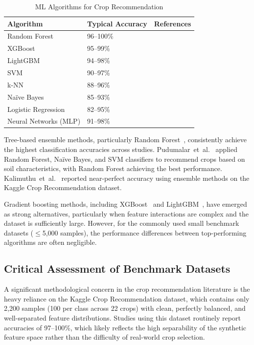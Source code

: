 \documentclass[journal]{IEEEtran}
\begin{document}
\begin{table}[htbp]
  \centering
  \caption{ML Algorithms for Crop Recommendation}
  \label{tab:crop_algorithms}
  \begin{tabular}{L{3.2cm} C{2.2cm} C{2cm}}
    \toprule
    \textbf{Algorithm} & \textbf{Typical Accuracy} & \textbf{References} \\
    \midrule
    Random Forest & 96--100\% & \cite{pudumalar2017crop,kalimuthu2020crop} \\
    XGBoost & 95--99\% & \cite{chen2016xgboost} \\
    LightGBM & 94--98\% & \cite{ke2017lightgbm} \\
    SVM & 90--97\% & \cite{pudumalar2017crop} \\
    k-NN & 88--96\% & \cite{rajak2017crop} \\
    Na{\"i}ve Bayes & 85--93\% & \cite{pudumalar2017crop} \\
    Logistic Regression & 82--95\% & \cite{bondre2019prediction} \\
    Neural Networks (MLP) & 91--98\% & \cite{bondre2019prediction} \\
    \bottomrule
  \end{tabular}
\end{table}

Tree-based ensemble methods, particularly Random Forest~\cite{breiman2001random}, consistently achieve the highest classification accuracies across studies. Pudumalar~et~al.~\cite{pudumalar2017crop} applied Random Forest, Na{\"i}ve Bayes, and SVM classifiers to recommend crops based on soil characteristics, with Random Forest achieving the best performance. Kalimuthu~et~al.~\cite{kalimuthu2020crop} reported near-perfect accuracy using ensemble methods on the Kaggle Crop Recommendation dataset.

Gradient boosting methods, including XGBoost~\cite{chen2016xgboost} and LightGBM~\cite{ke2017lightgbm}, have emerged as strong alternatives, particularly when feature interactions are complex and the dataset is sufficiently large. However, for the commonly used small benchmark datasets ($\leq$5,000 samples), the performance differences between top-performing algorithms are often negligible.

\subsection{Critical Assessment of Benchmark Datasets}

A significant methodological concern in the crop recommendation literature is the heavy reliance on the Kaggle Crop Recommendation dataset, which contains only 2,200 samples (100 per class across 22 crops) with clean, perfectly balanced, and well-separated feature distributions. Studies using this dataset routinely report accuracies of 97--100\%, which likely reflects the high separability of the synthetic feature space rather than the difficulty of real-world crop selection.
\end{document}
